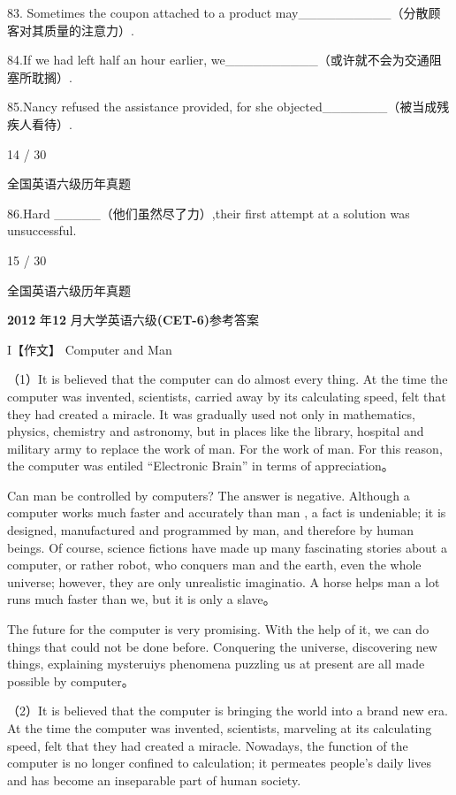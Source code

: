 \documentclass[UTF8,11pt]{ctexart}
\begin{document}
83. Sometimes the coupon attached to a product may\_\_\_\_\_\_\_\_\_\_（分散顾客对其质量的注意力）.


84.If we had left half an hour earlier, we\_\_\_\_\_\_\_\_\_\_（或许就不会为交通阻塞所耽搁）.


85.Nancy refused the assistance provided, for she objected\_\_\_\_\_\_\_（被当成残疾人看待）.


14 / 30


全国英语六级历年真题


86.Hard \_\_\_\_\_（他们虽然尽了力）,their first attempt at a solution was unsuccessful.


15 / 30


全国英语六级历年真题


\textbf{2012} 年\textbf{12} 月大学英语六级\textbf{(CET-6)}参考答案


I【作文】 Computer and Man


（1）It is believed that the computer can do almost every thing. At the time the computer was invented, scientists, carried away by its calculating speed, felt that they had created a miracle. It was gradually used not only in mathematics, physics, chemistry and astronomy, but in places like the library, hospital and military army to replace the work of man. For the work of man. For this reason, the computer was entiled “Electronic Brain” in terms of appreciation。


Can man be controlled by computers? The answer is negative. Although a computer works much faster and accurately than man , a fact is undeniable; it is designed, manufactured and programmed by man, and therefore by human beings. Of course, science fictions have made up many fascinating stories about a computer, or rather robot, who conquers man and the earth, even the whole universe; however, they are only unrealistic imaginatio. A horse helps man a lot runs much faster than we, but it is only a slave。


The future for the computer is very promising. With the help of it, we can do things that could not be done before. Conquering the universe, discovering new things, explaining mysteruiys phenomena puzzling us at present are all made possible by computer。


（2）It is believed that the computer is bringing the world into a brand new era. At the time the computer was invented, scientists, marveling at its calculating speed, felt that they had created a miracle. Nowadays, the function of the computer is no longer confined to calculation; it permeates people’s daily lives and has become an inseparable part of human society.
\end{document}
